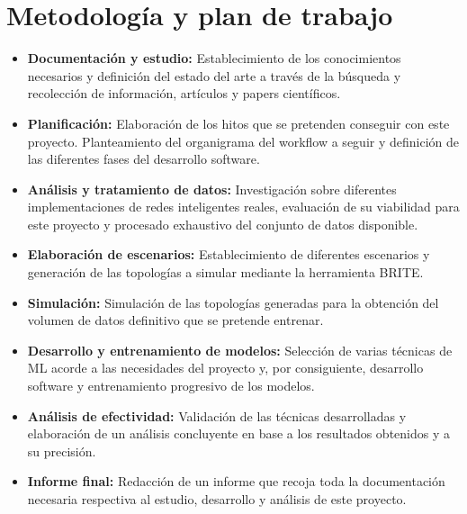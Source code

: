 \vspace{0.3cm}

\section{Metodología y plan de trabajo}
\vspace{0.3cm}
\begin{itemize}

\item \textbf{Documentación y estudio:} Establecimiento de los conocimientos necesarios y definición del estado del arte a través de la búsqueda y recolección de información, artículos y papers científicos.  

\item \textbf{Planificación:} Elaboración de los hitos que se pretenden conseguir con este proyecto. Planteamiento del organigrama del workflow a seguir y definición de las diferentes fases del desarrollo software.

\item \textbf{Análisis y tratamiento de datos:} Investigación sobre diferentes implementaciones de redes inteligentes reales, evaluación de su viabilidad para este proyecto y procesado exhaustivo del conjunto de datos disponible.

\item \textbf{Elaboración de escenarios:} Establecimiento de diferentes escenarios y generación de las topologías a simular mediante la herramienta BRITE.  

\newpage

\item \textbf{Simulación:} Simulación de las topologías generadas para la obtención del volumen de datos definitivo que se pretende entrenar.

\item \textbf{Desarrollo y entrenamiento de modelos:} Selección de varias técnicas de ML acorde a las necesidades del proyecto y, por consiguiente, desarrollo software y entrenamiento progresivo de los modelos.

\item \textbf{Análisis de efectividad:} Validación de las técnicas desarrolladas y elaboración de un análisis concluyente en base a los resultados obtenidos y a su precisión. 

\item \textbf{Informe final:} Redacción de un informe que recoja toda la documentación necesaria respectiva al estudio, desarrollo y análisis de este proyecto.

\end{itemize}


